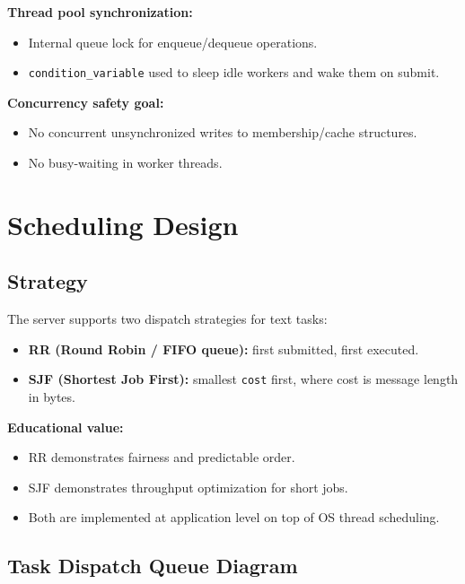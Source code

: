 \documentclass[12pt,letterpaper]{article}
\begin{document}
\noindent\textbf{Thread pool synchronization:}
\begin{itemize}[leftmargin=1.5em]
  \item Internal queue lock for enqueue/dequeue operations.
  \item \texttt{condition\_variable} used to sleep idle workers and wake them on submit.
\end{itemize}

\noindent\textbf{Concurrency safety goal:}
\begin{itemize}[leftmargin=1.5em]
  \item No concurrent unsynchronized writes to membership/cache structures.
  \item No busy-waiting in worker threads.
\end{itemize}

\section{Scheduling Design}

\subsection{Strategy}

The server supports two dispatch strategies for text tasks:

\begin{itemize}[leftmargin=1.5em]
  \item \textbf{RR (Round Robin / FIFO queue):} first submitted, first executed.
  \item \textbf{SJF (Shortest Job First):} smallest \texttt{cost} first,
        where cost is message length in bytes.
\end{itemize}

\medskip
\noindent\textbf{Educational value:}
\begin{itemize}[leftmargin=1.5em]
  \item RR demonstrates fairness and predictable order.
  \item SJF demonstrates throughput optimization for short jobs.
  \item Both are implemented at application level on top of OS thread scheduling.
\end{itemize}

\subsection{Task Dispatch Queue Diagram}
\end{document}
